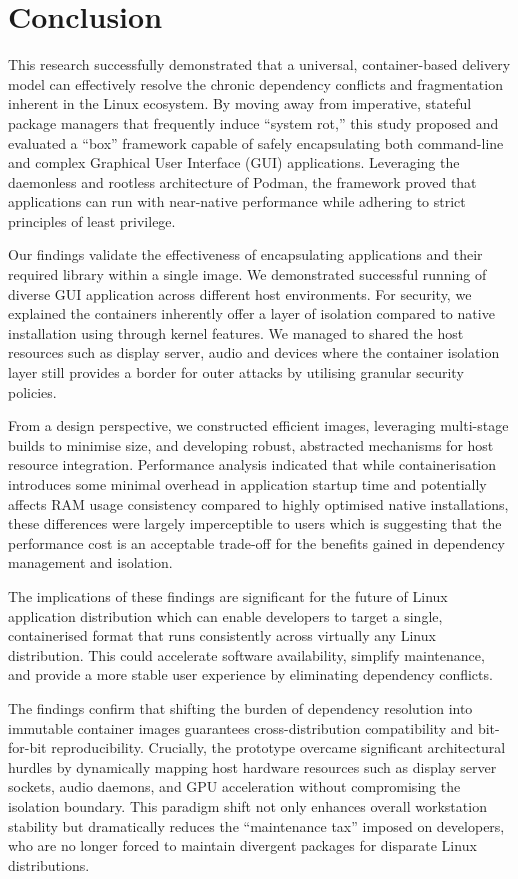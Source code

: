 \documentclass[journal,onecolumn]{IEEEtran}
\begin{document}
\newpage
\section{Conclusion}
This research successfully demonstrated that a universal, container-based delivery model can effectively resolve the chronic dependency conflicts and fragmentation inherent in the Linux ecosystem. By moving away from imperative, stateful package managers that frequently induce ``system rot,'' this study proposed and evaluated a ``box'' framework capable of safely encapsulating both command-line and complex Graphical User Interface (GUI) applications. Leveraging the daemonless and rootless architecture of Podman, the framework proved that applications can run with near-native performance while adhering to strict principles of least privilege. 

Our findings validate the effectiveness of encapsulating applications and their required library within a single image. We demonstrated successful running of diverse GUI application across different host environments. For security, we explained the containers inherently offer a layer of isolation compared to native installation using through kernel features. We managed to shared the host resources such as display server, audio and devices where the container isolation layer still provides a border for outer attacks by utilising granular security policies.

From a design perspective, we constructed efficient images, leveraging multi-stage builds to minimise size, and developing robust, abstracted mechanisms for host resource integration. Performance analysis indicated that while containerisation introduces some minimal overhead in application startup time and potentially affects RAM usage consistency compared to highly optimised native installations, these differences were largely imperceptible to users which is suggesting that the performance cost is an acceptable trade-off for the benefits gained in dependency management and isolation.

The implications of these findings are significant for the future of Linux application distribution which can enable developers to target a single, containerised format that runs consistently across virtually any Linux distribution. This could accelerate software availability, simplify maintenance, and provide a more stable user experience by eliminating dependency conflicts.

The findings confirm that shifting the burden of dependency resolution into immutable container images guarantees cross-distribution compatibility and bit-for-bit reproducibility. Crucially, the prototype overcame significant architectural hurdles by dynamically mapping host hardware resources such as display server sockets, audio daemons, and GPU acceleration without compromising the isolation boundary. This paradigm shift not only enhances overall workstation stability but dramatically reduces the ``maintenance tax'' imposed on developers, who are no longer forced to maintain divergent packages for disparate Linux distributions.
\end{document}
